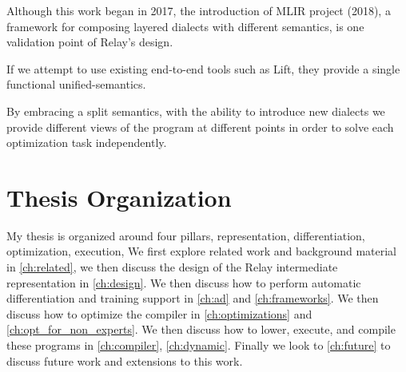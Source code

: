 Although this work began in 2017, the introduction of MLIR project (2018), a framework for composing layered dialects with different semantics,
is one validation point of Relay’s design.

If we attempt to use existing end-to-end tools such as Lift, they provide a single functional unified-semantics.

By embracing a split semantics, with the ability to introduce new dialects we provide different views of the program at different points in order to solve each optimization task independently.


\section{Thesis Organization}

My thesis is organized around four pillars, representation, differentiation, optimization, execution,
We first explore related work and background material
  in \ref{ch:related}, we then discuss the design of the Relay intermediate representation in \ref{ch:design}.
We then discuss how to perform automatic differentiation and training support in \ref{ch:ad} and
  \ref{ch:frameworks}.
We then discuss how to optimize the compiler in \ref{ch:optimizations} and \ref{ch:opt_for_non_experts}.
We then discuss how to lower, execute, and compile these programs in
\ref{ch:compiler}, \ref{ch:dynamic}.
Finally we look to \ref{ch:future} to discuss future work and extensions to this work.






